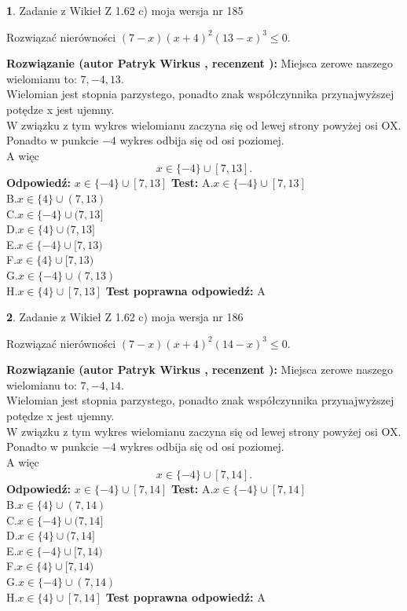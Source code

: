 \documentclass[12pt, a4paper]{article}
\theoremstyle{definition} %
\newtheorem{zad}{}
\newcommand{\zadStart}[1]{\begin{zad}#1\newline}
\newcommand{\zadStop}{\end{zad}}
\newcommand{\rozwStart}[2]{\noindent \textbf{Rozwiązanie (autor #1 , recenzent #2): }\newline}
\newcommand{\rozwStop}{\newline}
\newcommand{\odpStart}{\noindent \textbf{Odpowiedź:}\newline}
\newcommand{\odpStop}{\newline}
\newcommand{\testStart}{\noindent \textbf{Test:}\newline}
\newcommand{\testStop}{\newline}
\newcommand{\kluczStart}{\noindent \textbf{Test poprawna odpowiedź:}\newline}
\newcommand{\kluczStop}{\newline}
\begin{document}
\zadStart{Zadanie z Wikieł Z 1.62 c) moja wersja nr 185}

Rozwiązać nierówności $(7-x)(x+4)^{2}(13-x)^{3}\le0$.
\zadStop
\rozwStart{Patryk Wirkus}{}
Miejsca zerowe naszego wielomianu to: $7, -4, 13$.\\
Wielomian jest stopnia parzystego, ponadto znak współczynnika przy\linebreak najwyższej potędze x jest ujemny.\\ W związku z tym wykres wielomianu zaczyna się od lewej strony powyżej osi OX.\\
Ponadto w punkcie $-4$ wykres odbija się od osi poziomej.\\
A więc $$x \in \{-4\} \cup [7,13].$$
\rozwStop
\odpStart
$x \in \{-4\} \cup [7,13]$
\odpStop
\testStart
A.$x \in \{-4\} \cup [7,13]$\\
B.$x \in \{4\} \cup (7,13)$\\
C.$x \in \{-4\} \cup (7,13]$\\
D.$x \in \{4\} \cup (7,13]$\\
E.$x \in \{-4\} \cup [7,13)$\\
F.$x \in \{4\} \cup [7,13)$\\
G.$x \in \{-4\} \cup (7,13)$\\
H.$x \in \{4\} \cup [7,13]$
\testStop
\kluczStart
A
\kluczStop



\zadStart{Zadanie z Wikieł Z 1.62 c) moja wersja nr 186}

Rozwiązać nierówności $(7-x)(x+4)^{2}(14-x)^{3}\le0$.
\zadStop
\rozwStart{Patryk Wirkus}{}
Miejsca zerowe naszego wielomianu to: $7, -4, 14$.\\
Wielomian jest stopnia parzystego, ponadto znak współczynnika przy\linebreak najwyższej potędze x jest ujemny.\\ W związku z tym wykres wielomianu zaczyna się od lewej strony powyżej osi OX.\\
Ponadto w punkcie $-4$ wykres odbija się od osi poziomej.\\
A więc $$x \in \{-4\} \cup [7,14].$$
\rozwStop
\odpStart
$x \in \{-4\} \cup [7,14]$
\odpStop
\testStart
A.$x \in \{-4\} \cup [7,14]$\\
B.$x \in \{4\} \cup (7,14)$\\
C.$x \in \{-4\} \cup (7,14]$\\
D.$x \in \{4\} \cup (7,14]$\\
E.$x \in \{-4\} \cup [7,14)$\\
F.$x \in \{4\} \cup [7,14)$\\
G.$x \in \{-4\} \cup (7,14)$\\
H.$x \in \{4\} \cup [7,14]$
\testStop
\kluczStart
A
\kluczStop
\end{document}
